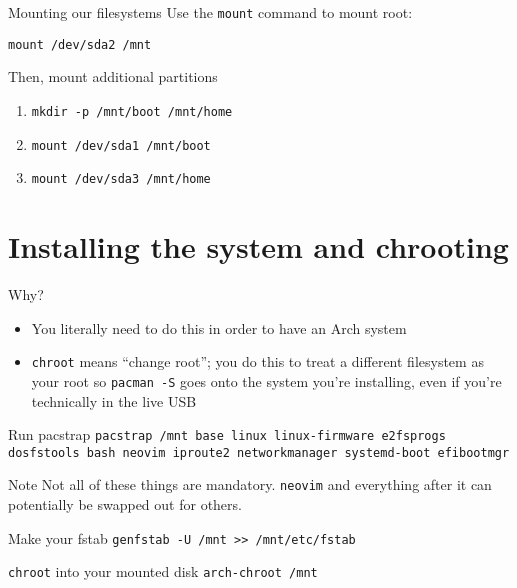 \documentclass{beamer}
\begin{document}
\begin{frame}{Mounting our filesystems}
    Use the \texttt{mount} command to mount root:

    \texttt{mount /dev/sda2 /mnt}

    Then, mount additional partitions
    \begin{enumerate}
        \item \texttt{mkdir -p /mnt/boot /mnt/home}
        \item \texttt{mount /dev/sda1 /mnt/boot}
        \item \texttt{mount /dev/sda3 /mnt/home}
    \end{enumerate}
\end{frame}

\section{Installing the system and chrooting}

\begin{frame}{Why?}
    \begin{itemize}
        \item You literally need to do this in order to have an Arch system
        \item \texttt{chroot} means ``change root''; you do this to treat a different filesystem as your root so \texttt{pacman -S} goes onto the system you're installing, even if you're technically in the live USB
    \end{itemize}
\end{frame}

\begin{frame}{Run pacstrap}
    \texttt{pacstrap /mnt base linux linux-firmware e2fsprogs dosfstools bash neovim iproute2 networkmanager systemd-boot efibootmgr}

    \begin{alertblock}{Note}
        Not all of these things are mandatory. \texttt{neovim} and everything after it can potentially be swapped out for others.
    \end{alertblock}
\end{frame}

\begin{frame}{Make your fstab}
    \texttt{genfstab -U /mnt >> /mnt/etc/fstab}
\end{frame}

\begin{frame}{\texttt{chroot} into your mounted disk}
    \texttt{arch-chroot /mnt}
\end{frame}
\end{document}
